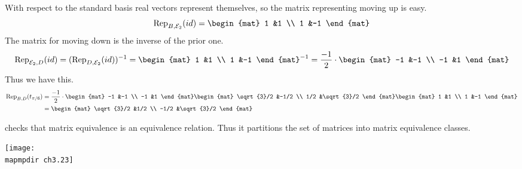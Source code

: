 \begin{frame}
With respect to the standard basis real vectors represent themselves,
so the matrix representing moving up is easy.
\begin{equation*}
  \rep{id}{B,\stdbasis_2}
  =\begin{mat}
    1 &1 \\
    1 &-1
  \end{mat}
\end{equation*}
The matrix for moving down is the inverse of the prior one.
\begin{equation*}
  \rep{id}{\stdbasis_2,D}
  =(\rep{id}{D,\stdbasis_2})^{-1}
  =
  \begin{mat}
    1 &1 \\
    1 &-1
  \end{mat}^{-1}
  =\frac{-1}{2}\cdot
  \begin{mat}
    -1 &-1 \\
   -1  &1
  \end{mat}
\end{equation*}
Thus we have this.
\begin{align*}
  \rep{t_{\pi/6}}{B,D}
  &=\frac{-1}{2}\cdot
  \begin{mat}
    -1 &-1 \\
   -1  &1
  \end{mat}
  \begin{mat}
    \sqrt{3}/2  &-1/2 \\
    1/2         &\sqrt{3}/2
  \end{mat}
  \begin{mat}
    1 &1 \\
    1 &-1
  \end{mat}                         \\
  &=
  \begin{mat}
    \sqrt{3}/2 &1/2 \\
    -1/2       &\sqrt{3}/2   
  \end{mat}
\end{align*}
\end{frame}




\begin{frame}
\pause
\co[le:MatEqIsSameMap]

\pause
\medskip
{} checks that
matrix equivalence is an equivalence relation.
Thus it  partitions 
the set of matrices into matrix equivalence classes.
\begin{center}
  \texttt{[image: \\mapmpdir ch3.23]}
\end{center}
\end{frame}





